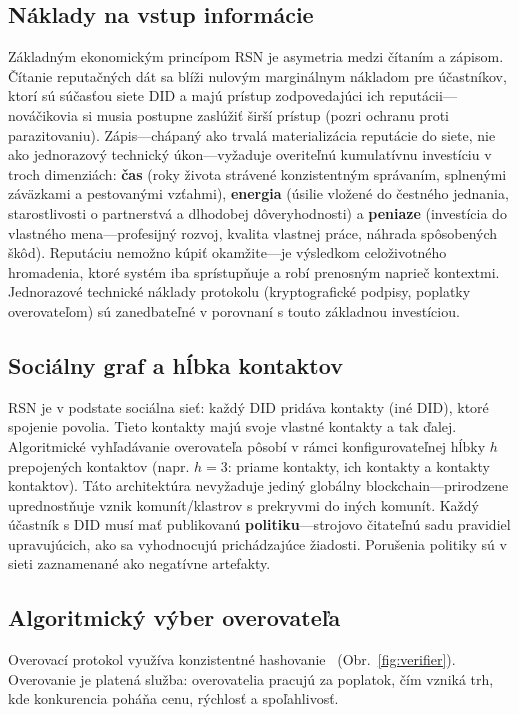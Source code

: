 \documentclass[11pt,a4paper,twocolumn]{article}
\begin{document}
\subsection{Náklady na vstup informácie}

Základným ekonomickým princípom RSN je asymetria medzi čítaním a zápisom. Čítanie reputačných dát sa blíži nulovým marginálnym nákladom pre účastníkov, ktorí sú súčasťou siete DID a majú prístup zodpovedajúci ich reputácii---nováčikovia si musia postupne zaslúžiť širší prístup (pozri ochranu proti parazitovaniu). Zápis---chápaný ako trvalá materializácia reputácie do siete, nie ako jednorazový technický úkon---vyžaduje overiteľnú kumulatívnu investíciu v troch dimenziách: \textbf{čas} (roky života strávené konzistentným správaním, splnenými záväzkami a pestovanými vzťahmi), \textbf{energia} (úsilie vložené do čestného jednania, starostlivosti o partnerstvá a dlhodobej dôveryhodnosti) a \textbf{peniaze} (investícia do vlastného mena---profesijný rozvoj, kvalita vlastnej práce, náhrada spôsobených škôd). Reputáciu nemožno kúpiť okamžite---je výsledkom celoživotného hromadenia, ktoré systém iba sprístupňuje a robí prenosným naprieč kontextmi. Jednorazové technické náklady protokolu (kryptografické podpisy, poplatky overovateľom) sú zanedbateľné v porovnaní s touto základnou investíciou.

\subsection{Sociálny graf a hĺbka kontaktov}

RSN je v podstate sociálna sieť: každý DID pridáva kontakty (iné DID), ktoré spojenie povolia. Tieto kontakty majú svoje vlastné kontakty a tak ďalej. Algoritmické vyhľadávanie overovateľa pôsobí v rámci konfigurovateľnej hĺbky $h$ prepojených kontaktov (napr. $h=3$: priame kontakty, ich kontakty a kontakty kontaktov). Táto architektúra nevyžaduje jediný globálny blockchain---prirodzene uprednostňuje vznik komunít/klastrov s prekryvmi do iných komunít. Každý účastník s DID musí mať publikovanú \textbf{politiku}---strojovo čitateľnú sadu pravidiel upravujúcich, ako sa vyhodnocujú prichádzajúce žiadosti. Porušenia politiky sú v sieti zaznamenané ako negatívne artefakty.

\subsection{Algoritmický výber overovateľa}

Overovací protokol využíva konzistentné hashovanie~\cite{karger1997} (Obr.~\ref{fig:verifier}). Overovanie je platená služba: overovatelia pracujú za poplatok, čím vzniká trh, kde konkurencia poháňa cenu, rýchlosť a spoľahlivosť.
\end{document}
